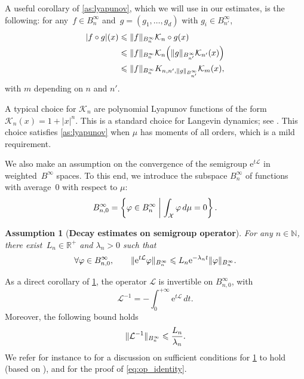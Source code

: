 \documentclass[11pt]{article}
\newcommand{\R}{\mathbb{R}}
\newcommand{\N}{\mathbb{N}}
\newcommand{\e}{\mathrm{e}}
\renewcommand{\L}{\mathcal{L}}
\renewcommand{\leq}{\leqslant}
\DeclarePairedDelimiter\norm{\lVert}{\rVert}
\DeclarePairedDelimiter\paren{\lparen}{\rparen}
\newtheorem{assumption}{Assumption}
\theoremstyle{definition}
\newcommand{\Binfz}{B_{n,0}^{\infty}}
\begin{document}
A useful corollary of \cref{as:lyapunov}, which we will use in our estimates, is the following: for any~$f\in B^\infty_{n}$ and~$g = (g_1,\dotsc,g_d)$ with $g_i \in B^\infty_{n'}$, 
\begin{align}
	|f\circ g|(x) &\leq \|f\|_{B_{n}^\infty}\mathcal{K}_{n} \circ g(x) \notag\\
    &\leq \|f\|_{B_{n}^\infty}\mathcal{K}_{n}\paren*{\|g\|_{B^\infty_{n'}} \mathcal{K}_{n'}(x)} \notag\\
    &\leq \norm{f}_{B^\infty_n}K_{n,n',\|g\|_{B^\infty_{n'}}}\mathcal{K}_{m}(x),
	\label{eq:lyap_composition_cor}
\end{align}
with $m$ depending on $n$ and $n'$.

A typical choice for $\mathcal{K}_n$ are polynomial Lyapunov functions of the form $\mathcal{K}_n(x) = 1+|x|^n$. This is a standard choice for Langevin dynamics; see \cite{mattingly2002,talay2002}. This choice satisfies \cref{as:lyapunov} when $\mu$ has moments of all orders, which is a mild requirement.

We also make an assumption on the convergence of the semigroup $\e^{t\L}$ in weighted~$B^\infty$ spaces. To this end, we introduce the subspace $B^\infty_n$ of functions with average~0 with respect to $\mu$:
\begin{equation}
    \notag
    \Binfz = \left\{\varphi \in B^\infty_n \; \middle| \; \int_\mathcal{X} \varphi \, d\mu = 0\right\}.
\end{equation}

\begin{assumption}[{\bf Decay estimates on semigroup operator}]
	\label{as:decay_semigroup}
For any $n\in\N$, there exist~$L_n \in \R^+$ and $\lambda_n>0$ such that
\begin{equation}
		\forall \varphi\in \Binfz, \qquad \|\e^{t\L}\varphi\|_{B^\infty_n} \leq L_n\e^{-\lambda_n t}\norm{\varphi}_{B^\infty_n}.
\label{eq:decay}
	\end{equation}
\end{assumption}

As a direct corollary of \cref{as:decay_semigroup}, the operator $\L$ is invertible on $\Binfz$, with
\begin{equation}
	\L^{-1} = -\int_0^{+\infty} \e^{t\L} \, dt.
	\label{eq:op_identity}
\end{equation}
Moreover, the following bound holds
\begin{equation}
    \notag
	\norm{\L^{-1}}_{B^\infty_n} \leq \frac{L_n}{\lambda_n}.
	\label{eq:Linv_bound}
\end{equation}
We refer for instance to \cite[Section 2]{lelievre2016} for a discussion on sufficient conditions for \cref{as:decay_semigroup} to hold (based on \cite{reybellet2006,hairer2011}), and for the proof of \eqref{eq:op_identity}. 
\end{document}
